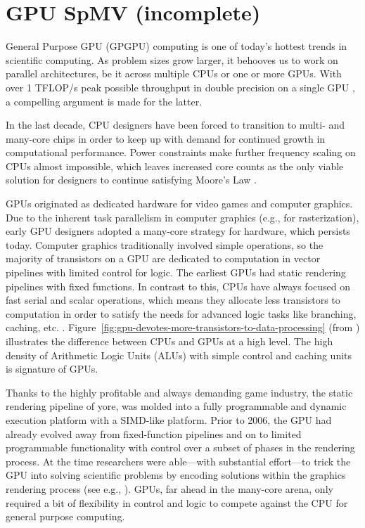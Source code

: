 \documentclass{report}
\begin{document}
\fi

\chapter{GPU SpMV (incomplete)}
\label{chap:gpu_rbffd}

General Purpose GPU (GPGPU) computing is one of today's hottest trends in scientific computing. As problem sizes grow larger, it behooves us to work on parallel architectures, be it across multiple CPUs or one or more GPUs. With over 1 TFLOP/s peak possible throughput in double precision on a single GPU \cite{KeplerFactSheet}, a compelling argument is made for the latter. 

In the last decade, CPU designers have been forced to transition to multi- and many-core chips in order to keep up with demand for continued growth in computational performance. 
Power constraints make further frequency scaling on CPUs almost impossible, which leaves increased core counts as the only viable solution for designers to continue satisfying Moore's Law \cite{Owens2007}. 

GPUs originated as dedicated hardware for video games and computer graphics. 
Due to the inherent task parallelism in computer graphics  (e.g., for rasterization), early GPU designers adopted a many-core strategy for hardware, which persists today. Computer graphics traditionally involved simple operations, so the majority of transistors on a GPU are dedicated to computation in vector pipelines with limited control for logic. The earliest GPUs had static rendering pipelines with fixed functions. In contrast to this, CPUs have always focused on fast serial and scalar operations, which means they allocate less transistors to computation in order to satisfy the needs for advanced logic tasks like branching, caching, etc. \cite{Owens2007,CudaGuide2013}. Figure~\ref{fig:gpu-devotes-more-transistors-to-data-processing} (from \cite{CudaGuide2013}) illustrates the difference between CPUs and GPUs at a high level. The high density of Arithmetic Logic Units (ALUs) with simple control and caching units is signature of GPUs. 

Thanks to the highly profitable and always demanding game industry, the static rendering pipeline of yore, was molded into a fully programmable and dynamic execution platform with a SIMD-like platform. Prior to 2006, the GPU had already evolved away from fixed-function pipelines and on to limited programmable functionality with control over a subset of phases in the rendering process. At the time researchers were able---with substantial effort---to trick the GPU into solving scientific problems by encoding solutions within the graphics rendering process (see e.g., \cite{Harris2005,Owens2007}).
GPUs, far ahead in the many-core arena, only required a bit of flexibility in control and logic to compete against the CPU for general purpose computing.  
\end{document}

